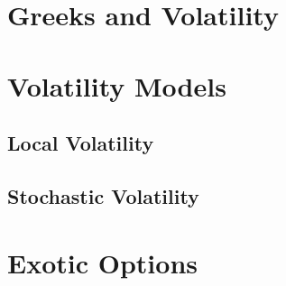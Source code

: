 


\section{Greeks and Volatility}





\section{Volatility Models}

\subsection{Local Volatility}



\subsection{Stochastic Volatility}




\section{Exotic Options}




